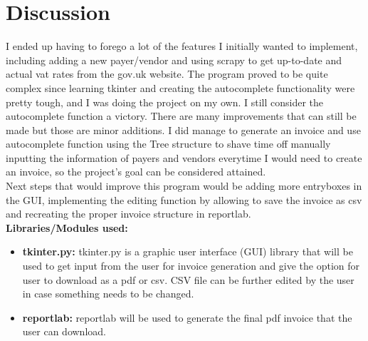 \documentclass[fontsize=11pt]{article}
\begin{document}
    \section*{Discussion}
    \noindent
    I ended up having to forego a lot of the features I initially wanted to implement, including adding a new payer/vendor and using scrapy to get up-to-date and actual vat rates from the gov.uk website. The program proved to be quite complex since learning tkinter and creating the autocomplete functionality were pretty tough, and I was doing the project on my own. I still consider the autocomplete function a victory. There are many improvements that can still be made but those are minor additions. I did manage to generate an invoice and use autocomplete function using the Tree structure to shave time off manually inputting the information of payers and vendors everytime I would need to create an invoice, so the project's goal can be considered attained.
    \\
    Next steps that would improve this program would be adding more entryboxes in the GUI, implementing the editing function by allowing to save the invoice as csv and recreating the proper invoice structure in reportlab.
    \\
    \noindent
    \textbf{Libraries/Modules used:}
    \begin{itemize}
        \item \textbf{tkinter.py:} tkinter.py is a graphic user interface (GUI) library that will be used to get input from the user for invoice generation and give the option for user to download as a pdf or csv. CSV file can be further edited by the user in case something needs to be changed.
        \item \textbf{reportlab:} reportlab will be used to generate the final pdf invoice that the user can download.
    \end{itemize}
\end{document}

